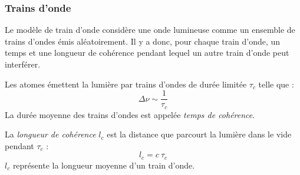 \documentclass[11pt,a4paper,fleqn,pdftex]{report}
\begin{document}
\subsubsection{Trains d'onde} %
\label{ssub:trains_d_onde}
Le modèle de train d'onde considère une onde lumineuse comme un ensemble de trains d'ondes émis aléatoirement. Il y a donc, pour chaque train d'onde, un temps et une longueur \og{}de cohérence\fg{} pendant lequel un autre train d'onde peut interférer. %
\begin{theorem}
   Les atomes émettent la lumière par trains d'ondes de durée limitée $\tau_c$ telle que : 
   \begin{equation}
   \Delta \nu \sim \dfrac{1}{\tau_c}
   \end{equation}
   La durée moyenne des trains d'ondes est appelée \emph{temps de cohérence}.
\end{theorem}
\begin{dfn}
   La \emph{longueur de cohérence} $l_c$ est la distance que parcourt la lumière dans le vide pendant $\tau_c$ : 
   \begin{equation}
   l_c = c~\tau_c
   \end{equation}
   $l_c$ représente la longueur moyenne d'un train d'onde.
\end{dfn}
\end{document}
